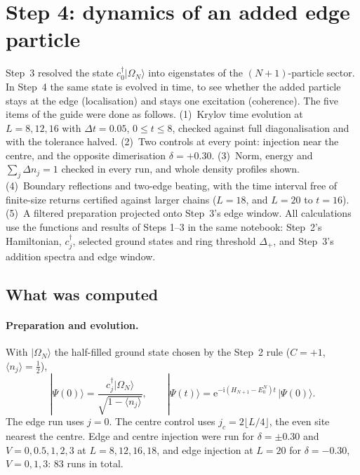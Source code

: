 \documentclass[11pt,a4paper]{article}
\newcommand{\cd}{c^{\dagger}}
\newcommand{\Om}{\Omega_N}
\newcommand{\Dp}{\Delta_{+}}
\newcommand{\ii}{\mathrm{i}}
\newcommand{\ee}{\mathrm{e}}
\begin{document}
\section{Step 4: dynamics of an added edge particle}
\label{s4:sec}

Step~3 resolved the state $\cd_0|\Om\rangle$ into eigenstates of the $(N+1)$-particle sector. In Step~4 the same state is evolved in time, to see whether the added particle stays at the edge (localisation) and stays one excitation (coherence). The five items of the guide were done as follows. (1)~Krylov time evolution at $L=8,12,16$ with $\Delta t=0.05$, $0\le t\le 8$, checked against full diagonalisation and with the tolerance halved. (2)~Two controls at every point: injection near the centre, and the opposite dimerisation $\delta=+0.30$. (3)~Norm, energy and $\sum_j\Delta n_j=1$ checked in every run, and whole density profiles shown. (4)~Boundary reflections and two-edge beating, with the time interval free of finite-size returns certified against larger chains ($L=18$, and $L=20$ to $t=16$). (5)~A filtered preparation projected onto Step~3's edge window. All calculations use the functions and results of Steps 1--3 in the same notebook: Step~2's Hamiltonian, $\cd_j$, selected ground states and ring threshold $\Dp$, and Step~3's addition spectra and edge window.

\subsection{What was computed}

\paragraph{Preparation and evolution.} With $|\Om\rangle$ the half-filled ground state chosen by the Step~2 rule ($C=+1$, $\langle n_j\rangle=\tfrac12$),
\begin{equation}
|\Psi(0)\rangle=\frac{\cd_j|\Om\rangle}{\sqrt{1-\langle n_j\rangle}},\qquad
|\Psi(t)\rangle=\ee^{-\ii(H_{N+1}-E_0^N)t}\,|\Psi(0)\rangle .
\label{s4:eq:prep}
\end{equation}
The edge run uses $j=0$. The centre control uses $j_c=2\lfloor L/4\rfloor$, the even site nearest the centre. Edge and centre injection were run for $\delta=\pm0.30$ and $V=0,0.5,1,2,3$ at $L=8,12,16,18$, and edge injection at $L=20$ for $\delta=-0.30$, $V=0,1,3$: 83 runs in total.
\end{document}
